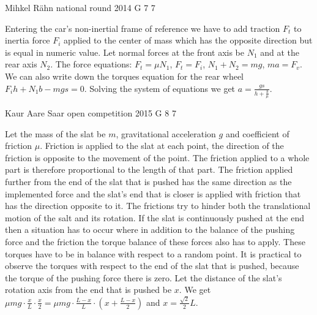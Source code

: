 \documentclass[11pt]{article}
\begin{document}
{Mihkel Rähn} %
{national round} %
{2014} %
{G 7} %
{7} %
{

\ifEngSolution
Entering the car’s non-inertial frame of reference we have to add traction $F_t$ to inertia force $F_i$ applied to the center of mass which has the opposite direction but is equal in numeric value. Let normal forces at the front axis be $N_1$ and at the rear axis $N_2$. The force equations: $F_t=\mu N_1$, $F_t=F_i$, $N_1+N_2=mg$, $ma=F_v$. We can also write down the torques equation for the rear wheel $F_ih+N_1b-mgs=0$. Solving the system of equations we get $a=\frac{gs}{h+\frac{b}{\mu}}$.
\fi
}

{Kaur Aare Saar} %
{open competition} %
{2015} %
{G 8} %
{7} %
{

\ifEngSolution
Let the mass of the slat be $m$, gravitational acceleration $g$ and coefficient of friction $\mu$. Friction is applied to the slat at each point, the direction of the friction is opposite to the movement of the point. The friction applied to a whole part is therefore proportional to the length of that part. The friction applied further from the end of the slat that is pushed has the same direction as the implemented force and the slat’s end that is closer is applied with friction that has the direction opposite to it. The frictions try to hinder both the translational motion of the salt and its rotation. If the slat is continuously pushed at the end then a situation has to occur where in addition to the balance of the pushing force and the friction the torque balance of these forces also has to apply. These torques have to be in balance with respect to a random point. It is practical to observe the torques with respect to the end of the slat that is pushed, because the torque of the pushing force there is zero. Let the distance of the slat’s rotation axis from the end that is pushed be $x$. We get $\mu mg \cdot \frac{x}{L} \cdot \frac{x}{2}=\mu mg \cdot \frac{L-x}{L} \cdot \left(x+\frac{L-x}{2}\right)$ and $x=\frac{\sqrt{2}}{2}L$.
\fi
}
\end{document}
